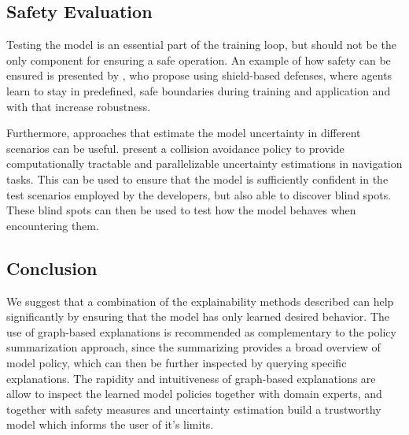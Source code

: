 \documentclass[twoside,11pt]{article}
\begin{document}
\begin{enumerate}
\subsection{Safety Evaluation}
Testing the model is an essential part of the training loop, but should not be the only component for ensuring a safe operation. An example of how safety can be ensured is presented by \citet{XiongEtAl:2020:Robustness}, who propose using shield-based defenses, where agents learn to stay in predefined, safe boundaries during training and application and with that increase robustness.

Furthermore, approaches that estimate the model uncertainty in different scenarios can be useful. \citet{LuetjensEverettHow:2018:RLModelUncertainty} present a collision avoidance policy to provide computationally tractable and parallelizable uncertainty estimations in navigation tasks. This can be used to ensure that the model is sufficiently confident in the test scenarios employed by the developers, but also able to discover blind spots. These blind spots can then be used to test how the model behaves when encountering them.

\subsection{Conclusion}

We suggest that a combination of the explainability methods described can help significantly by ensuring that the model has only learned desired behavior. The use of graph-based explanations is recommended as complementary to the policy summarization approach, since the summarizing provides a broad overview of model policy, which can then be further inspected by querying specific explanations. The rapidity and intuitiveness of graph-based explanations are allow to inspect the learned model policies together with domain experts, and together with safety measures and uncertainty estimation build a trustworthy model which informs the user of it's limits.


\end{enumerate}
\end{document}
